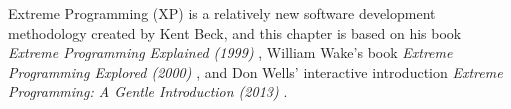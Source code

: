 Extreme Programming (XP) is a relatively new software development methodology created by Kent Beck, and this chapter is based on his book \textit{Extreme Programming Explained (1999)} \citep{xp:explained}, William Wake's book \textit{Extreme Programming Explored (2000)} \citep{xp:explored}, and Don Wells' interactive introduction \textit{Extreme Programming: A Gentle Introduction (2013)} \citep{xp:online}.